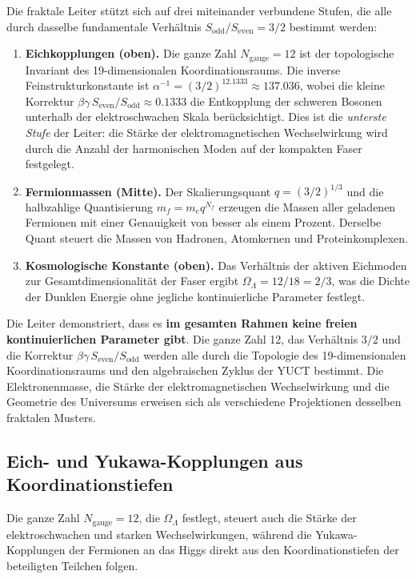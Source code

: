 \documentclass[12pt,a4paper]{article}
\begin{document}
	Die fraktale Leiter stützt sich auf drei miteinander verbundene Stufen, die alle durch dasselbe fundamentale Verhältnis \(S_{\mathrm{odd}}/S_{\mathrm{even}} = 3/2\) bestimmt werden:
	
	\begin{enumerate}[leftmargin=*]
		\item \textbf{Eichkopplungen (oben).} Die ganze Zahl \(N_{\mathrm{gauge}} = 12\) ist der topologische Invariant des 19-dimensionalen Koordinationsraums. Die inverse Feinstrukturkonstante ist \(\alpha^{-1} = (3/2)^{12.1333} \approx 137.036\), wobei die kleine Korrektur \(\beta\gamma\,S_{\mathrm{even}}/S_{\mathrm{odd}} \approx 0.1333\) die Entkopplung der schweren Bosonen unterhalb der elektroschwachen Skala berücksichtigt. Dies ist die \emph{unterste Stufe} der Leiter: die Stärke der elektromagnetischen Wechselwirkung wird durch die Anzahl der harmonischen Moden auf der kompakten Faser festgelegt.
		\item \textbf{Fermionmassen (Mitte).} Der Skalierungsquant \(q = (3/2)^{1/3}\) und die halbzahlige Quantisierung \(m_f = m_e q^{N_f}\) erzeugen die Massen aller geladenen Fermionen mit einer Genauigkeit von besser als einem Prozent. Derselbe Quant steuert die Massen von Hadronen, Atomkernen und Proteinkomplexen.
		\item \textbf{Kosmologische Konstante (oben).} Das Verhältnis der aktiven Eichmoden zur Gesamtdimensionalität der Faser ergibt \(\Omega_\Lambda = 12/18 = 2/3\), was die Dichte der Dunklen Energie ohne jegliche kontinuierliche Parameter festlegt.
	\end{enumerate}
	
	Die Leiter demonstriert, dass es \textbf{im gesamten Rahmen keine freien kontinuierlichen Parameter gibt}. Die ganze Zahl 12, das Verhältnis \(3/2\) und die Korrektur \(\beta\gamma\,S_{\mathrm{even}}/S_{\mathrm{odd}}\) werden alle durch die Topologie des 19-dimensionalen Koordinationsraums und den algebraischen Zyklus der YUCT bestimmt. Die Elektronenmasse, die Stärke der elektromagnetischen Wechselwirkung und die Geometrie des Universums erweisen sich als verschiedene Projektionen desselben fraktalen Musters.
	
	\subsection{Eich- und Yukawa-Kopplungen aus Koordinationstiefen}
	
	Die ganze Zahl \(N_{\mathrm{gauge}} = 12\), die \(\Omega_\Lambda\) festlegt, steuert auch die Stärke der elektroschwachen und starken Wechselwirkungen, während die Yukawa-Kopplungen der Fermionen an das Higgs direkt aus den Koordinationstiefen der beteiligten Teilchen folgen.
	
\end{document}
